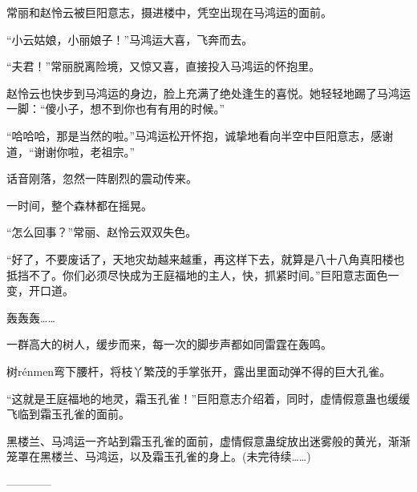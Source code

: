 \begin{this_body}
常丽和赵怜云被巨阳意志，摄进楼中，凭空出现在马鸿运的面前。

“小云姑娘，小丽娘子！”马鸿运大喜，飞奔而去。

“夫君！”常丽脱离险境，又惊又喜，直接投入马鸿运的怀抱里。

赵怜云也快步到马鸿运的身边，脸上充满了绝处逢生的喜悦。她轻轻地踢了马鸿运一脚：“傻小子，想不到你也有有用的时候。”

“哈哈哈，那是当然的啦。”马鸿运松开怀抱，诚挚地看向半空中巨阳意志，感谢道，“谢谢你啦，老祖宗。”

话音刚落，忽然一阵剧烈的震动传来。

一时间，整个森林都在摇晃。

“怎么回事？”常丽、赵怜云双双失色。

“好了，不要废话了，天地灾劫越来越重，再这样下去，就算是八十八角真阳楼也抵挡不了。你们必须尽快成为王庭福地的主人，快，抓紧时间。”巨阳意志面色一变，开口道。

轰轰轰……

一群高大的树人，缓步而来，每一次的脚步声都如同雷霆在轰鸣。

树rénmen弯下腰杆，将枝丫繁茂的手掌张开，露出里面动弹不得的巨大孔雀。

“这就是王庭福地的地灵，霜玉孔雀！”巨阳意志介绍着，同时，虚情假意蛊也缓缓飞临到霜玉孔雀的面前。

黑楼兰、马鸿运一齐站到霜玉孔雀的面前，虚情假意蛊绽放出迷雾般的黄光，渐渐笼罩在黑楼兰、马鸿运，以及霜玉孔雀的身上。(未完待续……)

------------

\end{this_body}


